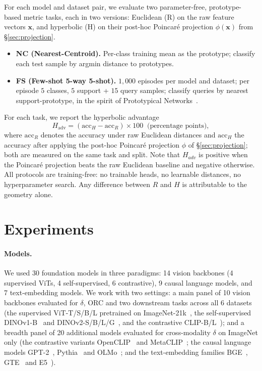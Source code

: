 \documentclass{article}
\begin{document}
For each model and dataset pair, we evaluate two parameter-free, prototype-based metric tasks, each in two versions: Euclidean (R) on the raw feature vectors $\boldsymbol{x}$, and hyperbolic (H) on their post-hoc Poincar\'{e} projection $\phi(\boldsymbol{x})$ from \S\ref{sec:projection}.
\begin{itemize}[topsep=0pt,itemsep=1pt,leftmargin=*]
\item \textbf{NC (Nearest-Centroid).} Per-class training mean as the prototype; classify each test sample by argmin distance to prototypes.
\item \textbf{FS (Few-shot 5-way 5-shot).} $1{,}000$ episodes per model and dataset; per episode $5$ classes, $5$ support + $15$ query samples; classify queries by nearest support-prototype, in the spirit of Prototypical Networks~\citep{snell2017proto}.
\end{itemize}
For each task, we report the hyperbolic advantage
\begin{equation}
H_\text{adv} = (\mathrm{acc}_H - \mathrm{acc}_R) \times 100 \;\; \text{(percentage points)},
\end{equation}
where $\mathrm{acc}_R$ denotes the accuracy under raw Euclidean distances and $\mathrm{acc}_H$ the accuracy after applying the post-hoc Poincar\'{e} projection $\phi$ of \S\ref{sec:projection}; both are measured on the same task and split.
Note that $H_{adv}$ is positive when the Poincar\'{e} projection beats the raw Euclidean baseline and negative otherwise. All protocols are training-free: no trainable heads, no learnable distances, no hyperparameter search. Any difference between $R$ and $H$ is attributable to the geometry alone.


\section{Experiments}
\label{sec:setup}

\paragraph{Models.} We used 30 foundation models in three paradigms: 14 vision backbones (4 supervised ViTs, 4 self-supervised, 6 contrastive), 9 causal language models, and 7 text-embedding models. We work with two settings: a main panel of 10 vision backbones evaluated for $\delta$, ORC and two downstream tasks across all 6 datasets (the supervised ViT-T/S/B/L pretrained on ImageNet-21k~\citep{dosovitskiy2021an}, the self-supervised DINOv1-B~\citep{dinov1} and DINOv2-S/B/L/G~\citep{dinov2}, and the contrastive CLIP-B/L~\citep{CLIP}); and a breadth panel of 20 additional models evaluated for cross-modality $\delta$ on ImageNet only (the contrastive variants OpenCLIP~\citep{openclip} and MetaCLIP~\citep{metaclip}; the causal language models GPT-2~\citep{gpt2}, Pythia~\citep{pythia} and OLMo~\citep{olmo}; and the text-embedding families BGE~\citep{BGE}, GTE~\citep{gte} and E5~\citep{e5}).
\end{document}
